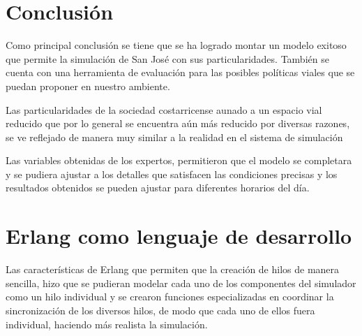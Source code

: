 \documentclass[conference]{IEEEtran}
\begin{document}
\section{Conclusi\'on}
Como principal conclusi\'on se tiene que se ha logrado montar un modelo exitoso que permite la simulaci\'on de San Jos\'e con sus particularidades. Tambi\'en se cuenta con una herramienta de evaluaci\'on para las posibles pol\'iticas viales que se puedan proponer en nuestro ambiente. 

Las particularidades de la sociedad costarricense aunado a un espacio vial reducido que por lo general se encuentra a\'un m\'as reducido por diversas razones, se ve reflejado de manera muy similar a la realidad en el sistema de simulaci\'on

Las variables obtenidas de los expertos, permitieron que el modelo se completara y se pudiera ajustar a los detalles que satisfacen las condiciones precisas y los resultados obtenidos se pueden ajustar para diferentes horarios del d\'ia.






%


\appendices
\section{Erlang como lenguaje de desarrollo}
Las caracter\'isticas de Erlang que permiten que la creaci\'on de hilos de manera sencilla, hizo que se pudieran modelar cada uno de los componentes del simulador como un hilo individual y se crearon funciones especializadas en coordinar la sincronizaci\'on de los diversos hilos, de modo que cada uno de ellos fuera individual, haciendo m\'as realista la simulaci\'on.
\end{document}
